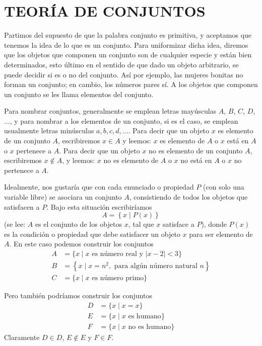 \chapter{TEORÍA DE CONJUNTOS}
\printchaptertableofcontents

Partimos del supuesto de que la palabra conjunto es primitiva, y aceptamos que tenemos la idea de lo que es un conjunto. Para uniformizar dicha idea, diremos que los objetos que componen un conjunto son de cualquier especie y están bien determinados, esto último en el sentido de que dado un objeto arbitrario, se puede decidir si es o no del conjunto. Así por ejemplo, las mujeres bonitas no forman un conjunto; en cambio, los números pares sí. A los objetos que componen un conjunto se les llama elementos del conjunto.

Para nombrar conjuntos, generalmente se emplean letras mayúsculas $A$, $B$, $C$, $D$, $\dots$, y para nombrar a los elementos de un conjunto, si es el caso, se emplean usualmente letras minúsculas $a, b, c, d, \dots$. Para decir que un objeto $x$ es elemento de un conjunto $A$, escribiremos $x \in A$ y leemos: $x$ es elemento de $A$ o $x$ está en $A$ o $x$ pertenece a $A$. Para decir que un objeto $x$ no es elemento de un conjunto $A$, escribiremos $x \notin A$, y leemos: $x$ no es elemento de $A$ o $x$ no está en $A$ o $x$ no pertenece a $A$.

Idealmente, nos gustaría que con cada enunciado o propiedad $P$ (con solo una variable libre) se asociara un conjunto $A$, consistiendo de todos los objetos que satisfacen a $P$. Bajo esta situación escribiríamos
$$A = \left\{x \mid P(x) \right\}$$
(se lee: $A$ es el conjunto de los objetos $x$, tal que $x$ satisface a $P$), donde $P(x)$ es la condición o propiedad que debe satisfacer un objeto $x$ para ser elemento de $A$. En este caso podemos construir los conjuntos
\begin{align*}
    A & = \{ x \mid x \text{ es número real y } |x-2|<3 \} \\
    B & = \left\{ x \mid x = n^2, \text{ para algún número natural } n \right\} \\
    C &  = \{ x \mid x \text{ es número primo}\}
\end{align*}

\newpage
Pero también podríamos construir los conjuntos
\begin{align*}
    D & = \{x \mid x = x\} \\ 
    E & = \{x \mid x \text { es humano}\} \\ 
    F & = \{x \mid x \text { no es humano}\}
\end{align*}
Claramente $D \in D$, $E \notin E$ y $F \in F$.

